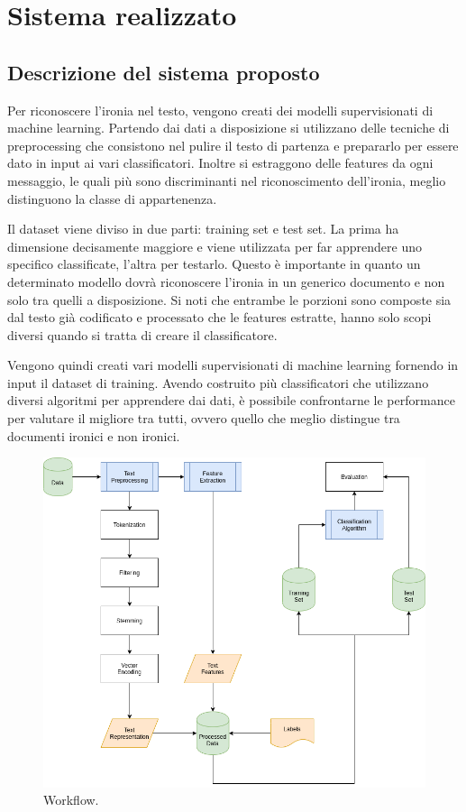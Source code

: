 \documentclass[oneside]{book}
\begin{document}
\chapter{Sistema realizzato}

\section{Descrizione del sistema proposto}
Per riconoscere l'ironia nel testo, vengono creati dei modelli supervisionati di machine learning.
Partendo dai dati a disposizione si utilizzano delle tecniche di preprocessing che consistono nel pulire il testo di partenza e prepararlo per essere dato in input ai vari classificatori. Inoltre si estraggono delle features da ogni messaggio, le quali più sono discriminanti nel riconoscimento dell'ironia, meglio distinguono la classe di appartenenza.

Il dataset viene diviso in due parti: training set e test set. La prima ha dimensione decisamente maggiore e viene utilizzata per far apprendere uno specifico classificate, l'altra per testarlo. Questo è importante in quanto un determinato modello dovrà riconoscere l'ironia in un generico documento e non solo tra quelli a disposizione. Si noti che entrambe le porzioni sono composte sia dal testo già codificato e processato che le features estratte, hanno solo scopi diversi quando si tratta di creare il classificatore. 

Vengono quindi creati vari modelli supervisionati di machine learning fornendo in input il dataset di training. Avendo costruito più classificatori che utilizzano diversi algoritmi per apprendere dai dati, è possibile confrontarne le performance per valutare il migliore tra tutti, ovvero quello che meglio distingue tra documenti ironici e non ironici.

\begin{figure}
	\includegraphics[width=\linewidth]{assets/Workflow.png}
	\caption{Workflow.}
	\label{fig:workflow}
\end{figure}
\end{document}
